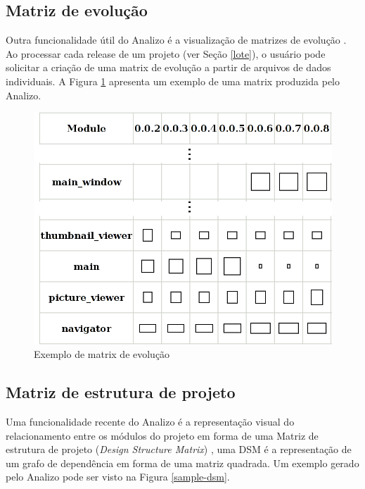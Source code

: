 \subsection{Matriz de evolução}

Outra funcionalidade útil do Analizo é a visualização de matrizes de evolução
\cite{Lanza2001}. Ao processar cada release de um projeto (ver Seção
\ref{lote}), o usuário pode solicitar a criação de uma matrix de evolução a
partir de arquivos de dados individuais. A Figura \ref{sample-evolution-matrix}
apresenta um exemplo de uma matrix produzida pelo Analizo.

\begin{figure}[h]
\center
\includegraphics[scale=0.2]{imagens/sample-evolution-matrix.png}
\caption{Exemplo de matrix de evolução}
\label{sample-evolution-matrix}
\end{figure}

\subsection{Matriz de estrutura de projeto}

Uma funcionalidade recente do Analizo é a representação visual do
relacionamento entre os módulos do projeto em forma de uma Matriz de estrutura
de projeto ({\it Design Structure Matrix}) \cite{Maccormack2006}, uma DSM é a
representação de um grafo de dependência em forma de uma matriz quadrada. Um
exemplo gerado pelo Analizo pode ser visto na Figura \ref{sample-dsm}.

